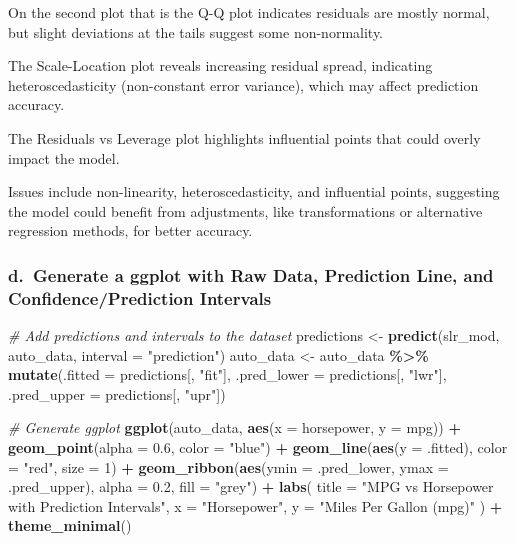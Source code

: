 \documentclass[
]{article}
\newenvironment{Shaded}{\begin{snugshade}}{\end{snugshade}}
\newcommand{\AttributeTok}[1]{\textcolor[rgb]{0.13,0.29,0.53}{#1}}
\newcommand{\CommentTok}[1]{\textcolor[rgb]{0.56,0.35,0.01}{\textit{#1}}}
\newcommand{\DecValTok}[1]{\textcolor[rgb]{0.00,0.00,0.81}{#1}}
\newcommand{\FloatTok}[1]{\textcolor[rgb]{0.00,0.00,0.81}{#1}}
\newcommand{\FunctionTok}[1]{\textcolor[rgb]{0.13,0.29,0.53}{\textbf{#1}}}
\newcommand{\NormalTok}[1]{#1}
\newcommand{\OtherTok}[1]{\textcolor[rgb]{0.56,0.35,0.01}{#1}}
\newcommand{\SpecialCharTok}[1]{\textcolor[rgb]{0.81,0.36,0.00}{\textbf{#1}}}
\newcommand{\StringTok}[1]{\textcolor[rgb]{0.31,0.60,0.02}{#1}}
\begin{document}
On the second plot that is the Q-Q plot indicates residuals are mostly
normal, but slight deviations at the tails suggest some non-normality.

The Scale-Location plot reveals increasing residual spread, indicating
heteroscedasticity (non-constant error variance), which may affect
prediction accuracy.

The Residuals vs Leverage plot highlights influential points that could
overly impact the model.

Issues include non-linearity, heteroscedasticity, and influential
points, suggesting the model could benefit from adjustments, like
transformations or alternative regression methods, for better accuracy.

\subsubsection{d.~Generate a ggplot with Raw Data, Prediction Line, and
Confidence/Prediction
Intervals}\label{d.-generate-a-ggplot-with-raw-data-prediction-line-and-confidenceprediction-intervals}

\begin{Shaded}
\begin{Highlighting}[]
\CommentTok{\# Add predictions and intervals to the dataset}
\NormalTok{predictions }\OtherTok{\textless{}{-}} \FunctionTok{predict}\NormalTok{(slr\_mod, auto\_data, }\AttributeTok{interval =} \StringTok{"prediction"}\NormalTok{)}
\NormalTok{auto\_data }\OtherTok{\textless{}{-}}\NormalTok{ auto\_data }\SpecialCharTok{\%\textgreater{}\%}
  \FunctionTok{mutate}\NormalTok{(}\AttributeTok{.fitted =}\NormalTok{ predictions[, }\StringTok{"fit"}\NormalTok{],}
         \AttributeTok{.pred\_lower =}\NormalTok{ predictions[, }\StringTok{"lwr"}\NormalTok{],}
         \AttributeTok{.pred\_upper =}\NormalTok{ predictions[, }\StringTok{"upr"}\NormalTok{])}

\CommentTok{\# Generate ggplot}
\FunctionTok{ggplot}\NormalTok{(auto\_data, }\FunctionTok{aes}\NormalTok{(}\AttributeTok{x =}\NormalTok{ horsepower, }\AttributeTok{y =}\NormalTok{ mpg)) }\SpecialCharTok{+}
  \FunctionTok{geom\_point}\NormalTok{(}\AttributeTok{alpha =} \FloatTok{0.6}\NormalTok{, }\AttributeTok{color =} \StringTok{"blue"}\NormalTok{) }\SpecialCharTok{+}
  \FunctionTok{geom\_line}\NormalTok{(}\FunctionTok{aes}\NormalTok{(}\AttributeTok{y =}\NormalTok{ .fitted), }\AttributeTok{color =} \StringTok{"red"}\NormalTok{, }\AttributeTok{size =} \DecValTok{1}\NormalTok{) }\SpecialCharTok{+}
  \FunctionTok{geom\_ribbon}\NormalTok{(}\FunctionTok{aes}\NormalTok{(}\AttributeTok{ymin =}\NormalTok{ .pred\_lower, }\AttributeTok{ymax =}\NormalTok{ .pred\_upper), }\AttributeTok{alpha =} \FloatTok{0.2}\NormalTok{, }\AttributeTok{fill =} \StringTok{"grey"}\NormalTok{) }\SpecialCharTok{+}
  \FunctionTok{labs}\NormalTok{(}
    \AttributeTok{title =} \StringTok{"MPG vs Horsepower with Prediction Intervals"}\NormalTok{,}
    \AttributeTok{x =} \StringTok{"Horsepower"}\NormalTok{,}
    \AttributeTok{y =} \StringTok{"Miles Per Gallon (mpg)"}
\NormalTok{  ) }\SpecialCharTok{+}
  \FunctionTok{theme\_minimal}\NormalTok{()}
\end{Highlighting}
\end{Shaded}
\end{document}
